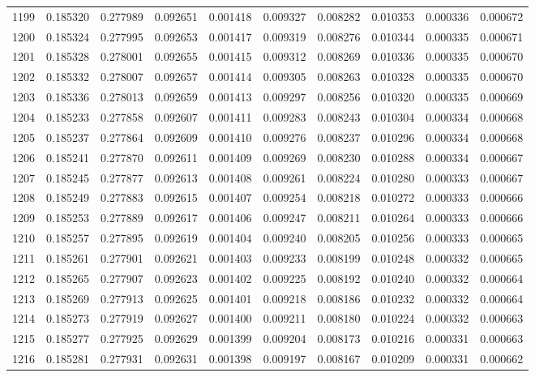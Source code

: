 \begin{tabular}{lrrrrrrrrr}
1199 & 0.185320 & 0.277989 & 0.092651 & 0.001418 & 0.009327 & 0.008282 & 0.010353 & 0.000336 & 0.000672 \\
1200 & 0.185324 & 0.277995 & 0.092653 & 0.001417 & 0.009319 & 0.008276 & 0.010344 & 0.000335 & 0.000671 \\
1201 & 0.185328 & 0.278001 & 0.092655 & 0.001415 & 0.009312 & 0.008269 & 0.010336 & 0.000335 & 0.000670 \\
1202 & 0.185332 & 0.278007 & 0.092657 & 0.001414 & 0.009305 & 0.008263 & 0.010328 & 0.000335 & 0.000670 \\
1203 & 0.185336 & 0.278013 & 0.092659 & 0.001413 & 0.009297 & 0.008256 & 0.010320 & 0.000335 & 0.000669 \\
1204 & 0.185233 & 0.277858 & 0.092607 & 0.001411 & 0.009283 & 0.008243 & 0.010304 & 0.000334 & 0.000668 \\
1205 & 0.185237 & 0.277864 & 0.092609 & 0.001410 & 0.009276 & 0.008237 & 0.010296 & 0.000334 & 0.000668 \\
1206 & 0.185241 & 0.277870 & 0.092611 & 0.001409 & 0.009269 & 0.008230 & 0.010288 & 0.000334 & 0.000667 \\
1207 & 0.185245 & 0.277877 & 0.092613 & 0.001408 & 0.009261 & 0.008224 & 0.010280 & 0.000333 & 0.000667 \\
1208 & 0.185249 & 0.277883 & 0.092615 & 0.001407 & 0.009254 & 0.008218 & 0.010272 & 0.000333 & 0.000666 \\
1209 & 0.185253 & 0.277889 & 0.092617 & 0.001406 & 0.009247 & 0.008211 & 0.010264 & 0.000333 & 0.000666 \\
1210 & 0.185257 & 0.277895 & 0.092619 & 0.001404 & 0.009240 & 0.008205 & 0.010256 & 0.000333 & 0.000665 \\
1211 & 0.185261 & 0.277901 & 0.092621 & 0.001403 & 0.009233 & 0.008199 & 0.010248 & 0.000332 & 0.000665 \\
1212 & 0.185265 & 0.277907 & 0.092623 & 0.001402 & 0.009225 & 0.008192 & 0.010240 & 0.000332 & 0.000664 \\
1213 & 0.185269 & 0.277913 & 0.092625 & 0.001401 & 0.009218 & 0.008186 & 0.010232 & 0.000332 & 0.000664 \\
1214 & 0.185273 & 0.277919 & 0.092627 & 0.001400 & 0.009211 & 0.008180 & 0.010224 & 0.000332 & 0.000663 \\
1215 & 0.185277 & 0.277925 & 0.092629 & 0.001399 & 0.009204 & 0.008173 & 0.010216 & 0.000331 & 0.000663 \\
1216 & 0.185281 & 0.277931 & 0.092631 & 0.001398 & 0.009197 & 0.008167 & 0.010209 & 0.000331 & 0.000662 \\

\end{tabular}

